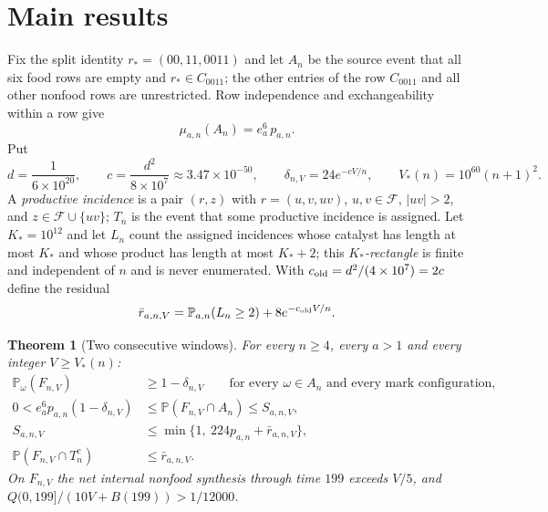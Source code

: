 \documentclass[11pt,letterpaper]{article}
\theoremstyle{plain}
\newtheorem{theorem}{Theorem}[section]
\theoremstyle{definition}
\theoremstyle{remark}
\numberwithin{equation}{section}
\newcommand{\PP}{\mathbb P}
\newcommand{\cF}{\mathcal F}
\begin{document}
\section{Main results}\label{sec:main}

Fix the split identity $r_*=(00,11,0011)$ and let $A_n$ be the source event that all six food rows are empty and $r_*\in C_{0011}$; the other entries of the row $C_{0011}$ and all other nonfood rows are unrestricted. Row independence and exchangeability within a row give
\begin{equation}\label{eq:witness}
 \mu_{a,n}(A_n)=e_a^6\,p_{a,n}.
\end{equation}
Put
\begin{equation}\label{eq:constants}
 d=\frac1{6\times10^{20}},\qquad c=\frac{d^2}{8\times10^7}\approx3.47\times10^{-50},\qquad
 \delta_{n,V}=24e^{-cV/n},\qquad V_*(n)=10^{60}(n+1)^2 .
\end{equation}
A \emph{productive incidence} is a pair $(r,z)$ with $r=(u,v,uv)$, $u,v\in\cF$, $|uv|>2$, and $z\in\cF\cup\{uv\}$; $T_n$ is the event that some productive incidence is assigned. Let $K_*=10^{12}$ and let $L_n$ count the assigned incidences whose catalyst has length at most $K_*$ and whose product has length at most $K_*+2$; this \emph{$K_*$-rectangle} is finite and independent of $n$ and is never enumerated. With $c_{\rm old}=d^2/(4\times10^7)=2c$ define the residual
\begin{equation}\label{eq:residual}
 \bar r_{a,n,V}=\PP_{a,n}(L_n\ge2)+8e^{-c_{\rm old}V/n}.
\end{equation}

\begin{theorem}[Two consecutive windows]\label{thm:finite}
For every $n\ge4$, every $a>1$ and every integer $V\ge V_*(n)$:
\begin{align}
 \PP_\omega(F_{n,V})&\ge1-\delta_{n,V}\qquad\text{for every }\omega\in A_n\text{ and every mark configuration,}\label{eq:uniform}\\
 0<e_a^6p_{a,n}(1-\delta_{n,V})&\le\PP(F_{n,V}\cap A_n)\le S_{a,n,V},\label{eq:lower}\\
 S_{a,n,V}&\le\min\{1,\ 224p_{a,n}+\bar r_{a,n,V}\},\label{eq:upper}\\
 \PP(F_{n,V}\cap T_n^c)&\le\bar r_{a,n,V}.\label{eq:bad}
\end{align}
On $F_{n,V}$ the net internal nonfood synthesis through time $199$ exceeds $V/5$, and $Q(0,199]/(10V+B(199))>1/12000$.
\end{theorem}
\end{document}
